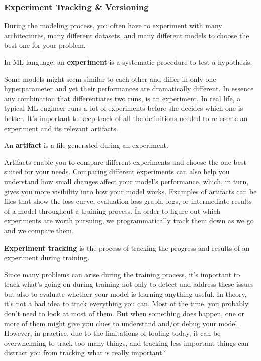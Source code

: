 
\subsubsection{Experiment Tracking \& Versioning}

During the modeling process, you often have to experiment with many architectures, many different datasets, and many
different models to choose the best one for your problem.

\bd[Experiment]
In ML language, an \textbf{experiment} is a systematic procedure to test a hypothesis.
\ed

Some models might seem similar to each other and differ in only one hyperparameter and yet their performances are
dramatically different. In essence any combination that differentiates two runs, is an experiment. In real life, a
typical ML engineer runs a lot of experiments before she decides which one is better. It's important to keep track of
all the definitions needed to re-create an experiment and its relevant artifacts.

\bd[Artifact]
An \textbf{artifact} is a file generated during an experiment.
\ed

Artifacts enable you to compare different experiments and choose the one best suited for your needs. Comparing
different experiments can also help you understand how small changes affect your model's performance, which, in turn,
gives you more visibility into how your model works. Examples of artifacts can be files that show the loss curve,
evaluation loss graph, logs, or intermediate results of a model throughout a training process. \v

In order to figure out which experiments are worth pursuing, we programmatically track them down as we go and we compare
them.

\textbf{Experiment tracking} is the process of tracking the progress and results of an experiment during training.
\ed

Since many problems can arise during the training process, it's important to track what's going on during training
not only to detect and address these issues but also to evaluate whether your model is learning anything useful. In
theory, it's not a bad idea to track everything you can. Most of the time, you probably don't need to look at most of
them. But when something does happen, one or more of them might give you clues to understand and/or debug your model.
However, in practice, due to the limitations of tooling today, it can be overwhelming to track too many things, and
tracking less important things can distract you from tracking what is really important. \v

